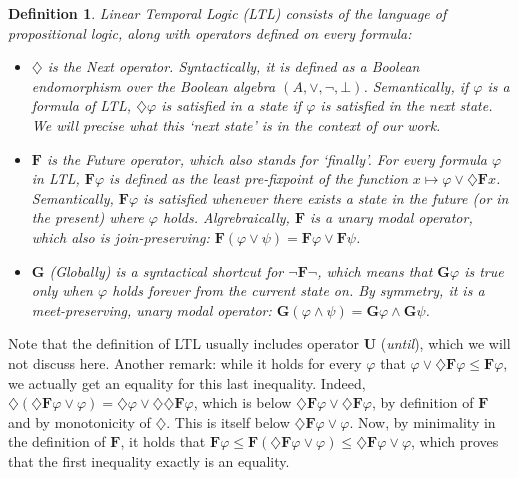 \documentclass[11pt]{article}
\newcommand{\F}{{\mathbf{F}}}
\newcommand{\orr}{{\vee}}
\newcommand{\andd}{{\wedge}}
\newcommand{\phii}{{\varphi}}
\newcommand{\G}{{\mathbf{G}}}
\newcommand{\dia}{{\diamondsuit}}
\newtheorem*{definition}{Definition}
\begin{document}
\begin{definition}\label{LTL}
    \emph{Linear Temporal Logic} (LTL) consists of the language of propositional logic, along with
    operators defined on every formula:
    \begin{itemize}
        \item[-] $\dia$ is the \emph{Next} operator. Syntactically, it is defined as a Boolean 
            endomorphism over the Boolean algebra $(A,\orr,\neg,\bot)$. Semantically, if $\phii$ is 
            a formula of LTL, $\dia\phii$ is 
            satisfied in a state if $\phii$ is satisfied in the next state. We will precise what this
            `next state' is in the context of our work.
        \item[-] $\F$ is the \emph{Future} operator, which also stands for `finally'.
            For every formula $\phii$ in LTL, $\F\phii$ is defined as the least pre-fixpoint of the
            function $x\mapsto \phii\orr\dia\F x$. Semantically, $\F\phii$ is satisfied whenever there
            exists a state in the future (or in the present) where $\phii$ holds. Algrebraically,
            $\F$ is a \emph{unary modal operator}, which also is \emph{join-preserving}:
            $\F(\phii\orr\psi)=\F\phii\orr\F\psi$.
        \item[-]$\G$ \emph{(Globally)} is a syntactical shortcut for $\neg\F\neg$, which means that $\G\phii$ is true 
            only when
            $\phii$ holds forever from the current state on. By symmetry, it is a meet-preserving,
            unary modal operator: $\G(\phii\andd\psi)=\G\phii\andd\G\psi$.
    \end{itemize}
\end{definition}
Note that the definition of LTL usually includes operator $\mathbf{U}$ (\emph{until}), which we will not
discuss here.
Another remark: while it holds for every $\phii$ that $\phii\orr\dia\F\phii\leq\F\phii$, we actually
get an equality for this last inequality. Indeed, $\dia(\dia\F\phii\orr\phii)=\dia\phii\orr\dia\dia\F\phii$,
which is below $\dia\F\phii\orr\dia\F\phii$, by definition of $\F$ and by monotonicity of $\dia$. This
is itself below $\dia\F\phii\orr\phii$. Now, by minimality in the definition of $\F$, it holds that
$\F\phii\leq\F(\dia\F\phii\orr\phii)\leq\dia\F\phii\orr\phii$, which proves that the first inequality
exactly is an equality.
\end{document}
